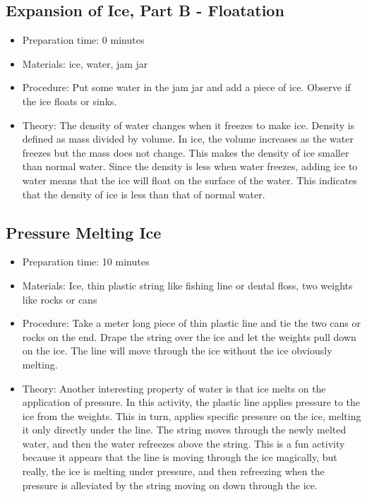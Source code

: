 \subsection{Expansion of Ice, Part B - Floatation}
\begin{itemize}
\item{Preparation time: 0 minutes}
\item{Materials: ice, water, jam jar}
\item{Procedure: Put some water in the jam jar and add a piece of ice. Observe if the ice floats or sinks.}
\item{Theory: The density of water changes when it freezes to make ice. Density is defined as mass divided by volume. In ice, the volume increases as the water freezes but the mass does not change. This makes the density of ice smaller than normal water. Since the density is less when water freezes, adding ice to water means that the ice will float on the surface of the water. This indicates that the density of ice is less than that of normal water.}
\end{itemize}

\subsection{Pressure Melting Ice}
\begin{itemize}
\item{Preparation time: 10 minutes}
\item{Materials: Ice, thin plastic string like fishing line or dental floss, two weights like rocks or cans}
\item{Procedure: Take a meter long piece of thin plastic line and tie the two cans or rocks on the end. Drape the string over the ice and let the weights pull down on the ice. The line will move through the ice without the ice obviously melting.}
\item{Theory: Another interesting property of water is that ice melts on the application of pressure. In this activity, the plastic line applies pressure to the ice from the weights. This in turn, applies specific pressure on the ice, melting it only directly under the line. The string moves through the newly melted water, and then the water refreezes above the string. This is a fun activity because it appears that the line is moving through the ice magically, but really, the ice is melting under pressure, and then refreezing when the pressure is alleviated by the string moving on down through the ice.}
\end{itemize}
